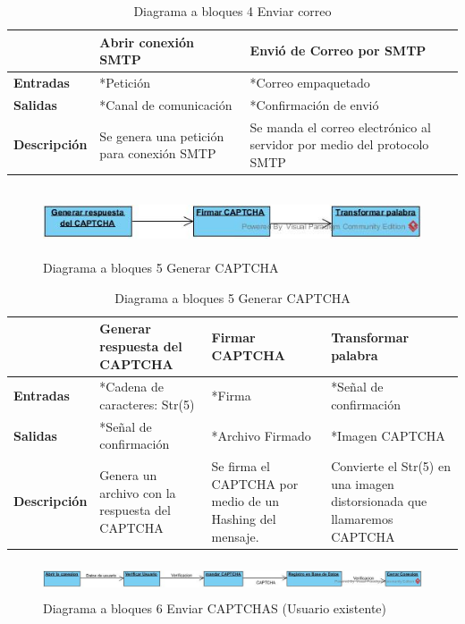 \begin{table}[H]
 \centering
   {
     \begin{tabular}{| p{4cm} | p{4cm} | p{4cm} |}
     \hline
     & \textbf{Abrir conexión SMTP} & \textbf{Envió de Correo por SMTP}\\
     \hline
     \textbf{Entradas} & *Petición & *Correo empaquetado\\
     \hline
     \textbf{Salidas} & *Canal de comunicación & *Confirmación de envió\\
     \hline
     \textbf{Descripción} & Se genera una petición para conexión SMTP  & Se manda el correo electrónico al servidor por medio del protocolo SMTP\\

    \end{tabular}
    }
    \caption{Diagrama a bloques 4 Enviar correo}
    \label{tabla:b4}
\end{table}
\clearpage
\begin{figure}[H]
	\includegraphics[width=1\linewidth, height=2cm]{./images/bloques5.jpg}
	\caption{Diagrama a bloques 5 Generar CAPTCHA}
	\label{fig:5-5-1}
\end{figure}
\begin{table}[H]
 \centering
   {
     \begin{tabular}{| p{4cm} | p{4cm} | p{4cm} | p{4cm} |}
     \hline
     & \textbf{Generar respuesta del CAPTCHA} & \textbf{Firmar CAPTCHA} & \textbf{Transformar palabra}\\
     \hline
     \textbf{Entradas} & *Cadena de caracteres: Str(5) & *Firma & *Señal de confirmación\\
     \hline
     \textbf{Salidas} & *Señal de confirmación & *Archivo Firmado & *Imagen CAPTCHA\\
     \hline
     \textbf{Descripción} & Genera un archivo con la respuesta del CAPTCHA  & Se firma el CAPTCHA por medio de un Hashing del mensaje. & Convierte el Str(5) en una imagen distorsionada que llamaremos CAPTCHA\\

    \end{tabular}
    }
    \caption{Diagrama a bloques 5 Generar CAPTCHA}
    \label{tabla:b5}
\end{table}
\newpage
\begin{figure}[H]
	\includegraphics[width=1\linewidth, height=1cm]{./images/bloques6.jpg}
	\caption{Diagrama a bloques 6 Enviar CAPTCHAS (Usuario existente)}
	\label{fig:5-6-1}
\end{figure}

